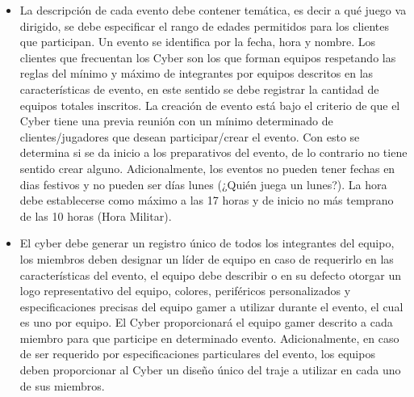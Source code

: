 \documentclass[a4paper,12pt]{article}
\begin{document}
\begin{itemize}
\item La descripción de cada evento debe contener temática, es decir a qué juego va dirigido, se debe especificar el rango de edades permitidos para los clientes que participan. Un evento se identifica por la fecha, hora y nombre. Los clientes que frecuentan los Cyber son los que forman equipos respetando las reglas del mínimo y máximo de integrantes por equipos descritos en las características de evento, en este sentido se debe registrar la cantidad de equipos totales inscritos. La creación de evento está bajo el criterio de que el Cyber tiene una previa reunión con un mínimo determinado de clientes/jugadores que desean participar/crear el evento. Con esto se determina si se da inicio a los preparativos del evento, de lo contrario no tiene sentido crear alguno. Adicionalmente, los eventos no pueden tener fechas en dias festivos y no pueden ser días lunes (¿Quién juega un lunes?). La hora debe establecerse como máximo a las 17 horas y de inicio no más temprano de las 10 horas (Hora Militar).

\item El cyber debe generar un registro único de todos los integrantes del equipo, los miembros deben designar un líder de equipo en caso de requerirlo en las características del evento, el equipo debe describir o en su defecto otorgar un logo representativo del equipo, colores, periféricos personalizados y especificaciones precisas del equipo gamer a utilizar durante el evento, el cual es uno por equipo. El Cyber proporcionará el equipo gamer descrito a cada miembro para que participe en determinado evento. Adicionalmente, en caso de ser requerido por especificaciones particulares del evento, los equipos deben proporcionar al Cyber un diseño único del traje a utilizar en cada uno de sus miembros.

\end{itemize}
\end{document}
